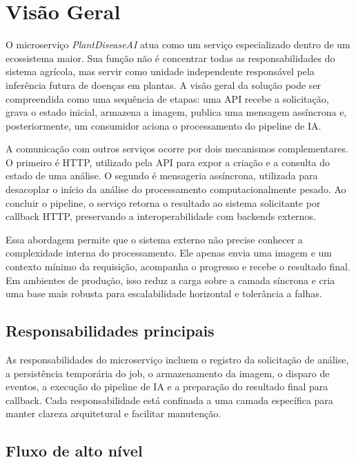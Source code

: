 \chapter{Visão Geral}

O microserviço \textit{PlantDiseaseAI} atua como um serviço especializado dentro de um ecossistema maior. Sua função não é concentrar todas as responsabilidades do sistema agrícola, mas servir como unidade independente responsável pela inferência futura de doenças em plantas. A visão geral da solução pode ser compreendida como uma sequência de etapas: uma API recebe a solicitação, grava o estado inicial, armazena a imagem, publica uma mensagem assíncrona e, posteriormente, um consumidor aciona o processamento do pipeline de IA.

A comunicação com outros serviços ocorre por dois mecanismos complementares. O primeiro é HTTP, utilizado pela API para expor a criação e a consulta do estado de uma análise. O segundo é mensageria assíncrona, utilizada para desacoplar o início da análise do processamento computacionalmente pesado. Ao concluir o pipeline, o serviço retorna o resultado ao sistema solicitante por callback HTTP, preservando a interoperabilidade com backends externos.

Essa abordagem permite que o sistema externo não precise conhecer a complexidade interna do processamento. Ele apenas envia uma imagem e um contexto mínimo da requisição, acompanha o progresso e recebe o resultado final. Em ambientes de produção, isso reduz a carga sobre a camada síncrona e cria uma base mais robusta para escalabilidade horizontal e tolerância a falhas.

\section{Responsabilidades principais}

As responsabilidades do microserviço incluem o registro da solicitação de análise, a persistência temporária do job, o armazenamento da imagem, o disparo de eventos, a execução do pipeline de IA e a preparação do resultado final para callback. Cada responsabilidade está confinada a uma camada específica para manter clareza arquitetural e facilitar manutenção.

\section{Fluxo de alto nível}


